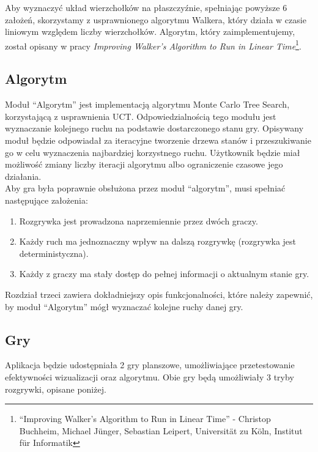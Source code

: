 \documentclass{article}
\begin{document}
	\noindent Aby wyznaczyć układ wierzchołków na płaszczyźnie, spełniając powyższe 6 założeń, skorzystamy z usprawnionego algorytmu Walkera, który działa w czasie liniowym względem liczby wierzchołków. Algorytm, który zaimplementujemy, został opisany w pracy \textit{Improving Walker's Algorithm to Run in Linear Time}\footnote{``Improving Walker's Algorithm to Run in Linear Time'' - Christop Buchheim, Michael Jünger, Sebastian Leipert, Universität zu Köln, Institut für Informatik}.
	
	\subsection{Algorytm}
	Moduł ``Algorytm'' jest implementacją algorytmu Monte Carlo Tree Search, korzystającą z usprawnienia UCT. Odpowiedzialnością tego modułu jest wyznaczanie kolejnego ruchu na podstawie dostarczonego stanu gry. Opisywany moduł będzie odpowiadał za iteracyjne tworzenie drzewa stanów i przeszukiwanie go w celu wyznaczenia najbardziej korzystnego ruchu. Użytkownik będzie miał możliwość zmiany liczby iteracji algorytmu albo ograniczenie czasowe jego działania. \\
	
	\noindent Aby gra była poprawnie obsłużona przez moduł ``algorytm'', musi spełniać następujące założenia: \\
		
	\begin{enumerate}
		\item Rozgrywka jest prowadzona naprzemiennie przez dwóch graczy.
		\item Każdy ruch ma jednoznaczny wpływ na dalszą rozgrywkę (rozgrywka jest deterministyczna).
		\item Każdy z graczy ma stały dostęp do pełnej informacji o aktualnym stanie gry. \\
	\end{enumerate} 
	
	\noindent Rozdział trzeci zawiera dokładniejszy opis funkcjonalności, które należy zapewnić, by moduł ``Algorytm'' mógł wyznaczać kolejne ruchy danej gry.
	
	\subsection{Gry}
	Aplikacja będzie udostępniała 2 gry planszowe, umożliwiające przetestowanie efektywności wizualizacji oraz algorytmu. Obie gry będą umożliwiały 3 tryby rozgrywki, opisane poniżej. \\
	
\end{document}
